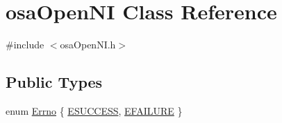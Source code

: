 \hypertarget{classosa_open_n_i}{\section{osa\-Open\-N\-I Class Reference}
\label{classosa_open_n_i}
}


{\ttfamily \#include $<$osa\-Open\-N\-I.\-h$>$}

\subsection*{Public Types}
\begin{DoxyCompactItemize}
\item 
enum \hyperlink{classosa_open_n_i_a9f02bd17e25b1ee362b08c5620e307db}{Errno} \{ \hyperlink{classosa_open_n_i_a9f02bd17e25b1ee362b08c5620e307dba78d51d697ce0176897623cb3094bb2b2}{E\-S\-U\-C\-C\-E\-S\-S}, 
\hyperlink{classosa_open_n_i_a9f02bd17e25b1ee362b08c5620e307dba4eb89ca8c5addf282144176f9d013b57}{E\-F\-A\-I\-L\-U\-R\-E}
 \}
\end{DoxyCompactItemize}
